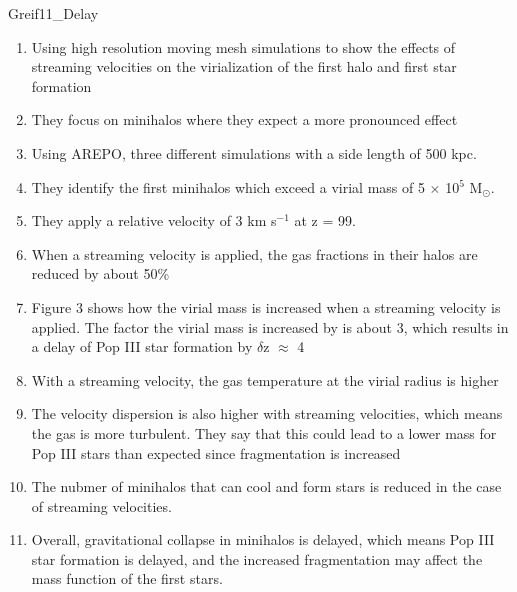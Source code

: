 \documentclass[a4paper,fleqn,usenatbib]{mnras}
\begin{document}
\li Greif11_Delay
\begin{enumerate}
	\item Using high resolution moving mesh simulations to show the effects of streaming velocities on the virialization of the first halo and first star formation
	\item They focus on minihalos where they expect a more pronounced effect
	\item Using AREPO, three different simulations with a side length of 500 kpc.
	\item They identify the first minihalos which exceed a virial mass of 5 $\times$ 10$^{5}$ M$_{\odot}$.
	\item They apply a relative velocity of 3 km s$^{-1}$ at z = 99.
	\item When a streaming velocity is applied, the gas fractions in their halos are reduced by about 50\%
	\item Figure 3 shows how the virial mass is increased when a streaming velocity is applied. The factor the virial mass is increased by is about 3, which results in a delay of Pop III star formation by $\delta$z $\approx$ 4
	\item With a streaming velocity, the gas temperature at the virial radius is higher
	\item The velocity dispersion is also higher with streaming velocities, which means the gas is more turbulent. They say that this could lead to a lower mass for Pop III stars than expected since fragmentation is increased
	\item The nubmer of minihalos that can cool and form stars is reduced in the case of streaming velocities. 
	\item Overall, gravitational collapse in minihalos is delayed, which means Pop III star formation is delayed, and the increased fragmentation may affect the mass function of the first stars. 
\end{enumerate}
\end{document}
